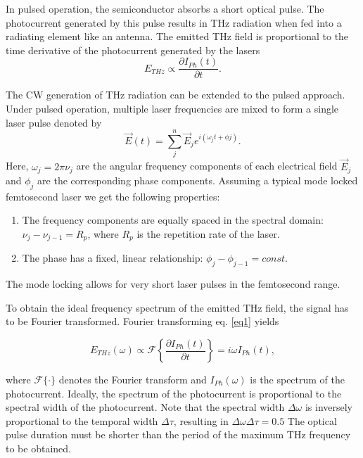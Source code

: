 In pulsed operation, the semiconductor absorbs a short optical pulse. The photocurrent generated by this pulse results in THz radiation when fed into a radiating element like an antenna. The emitted THz field is proportional to the time derivative of the photocurrent generated by the lasers \cite{preuTunableContinuouswaveTerahertz2011}
\begin{equation}
	E_{THz} \propto \frac{\partial I_{Ph}(t)}{\partial t}.
\label{eq1}
\end{equation}

The CW generation of THz radiation can be extended to the pulsed approach. Under pulsed operation, multiple laser frequencies are mixed to form a single laser pulse denoted by 
\begin{equation}
	\vec{E}(t) = \sum_j^n \vec{E}_je^{i(\omega_j t + \phi j)}.
\label{eq3}
\end{equation}
Here, $\omega_j = 2 \pi \nu_j$ are the angular frequency components of each electrical field $\vec{E}_j$ and $\phi_j$ are the corresponding phase components. Assuming a typical mode locked femtosecond laser we get the following properties: 
\renewcommand{\labelenumi}{\alph{enumi})}
\begin{enumerate}
	\item The frequency components are equally spaced in the spectral domain: $\nu_j - \nu_{j-1} = R_p$, where $R_p$ is the repetition rate of the laser.
	\item The phase has a fixed, linear relationship: $\phi_j - \phi_{j-1} = const.$
\end{enumerate}

The mode locking allows for very short laser pulses in the femtosecond range.

To obtain the ideal frequency spectrum of the emitted THz field, the signal has to be Fourier transformed. Fourier transforming eq. \eqref{eq1} yields

\begin{equation}
	E_{THz}(\omega) \propto \mathcal{F}\left\{ \frac{\partial I_{Ph}(t)}{\partial t} \right\} = i\omega I_{Ph}(t), 
\end{equation}

where $\mathcal{F}\{\cdot \}$ denotes the Fourier transform and $I_{Ph}(\omega)$ is the spectrum of the photocurrent. Ideally, the spectrum of the photocurrent is proportional to the spectral width of the photocurrent. Note that the spectral width $\Delta \omega$ is inversely proportional to the temporal width $\Delta \tau$, resulting in $\Delta \omega \Delta \tau = 0.5$ The optical pulse duration must be shorter than the period of the maximum THz frequency to be obtained. 

